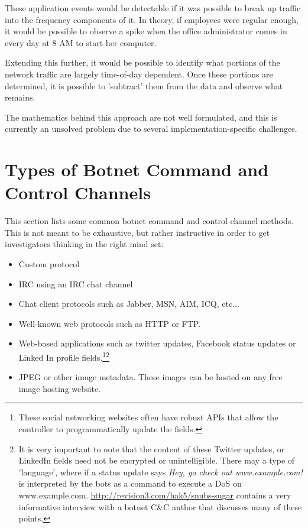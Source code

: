 \documentclass{article}
\theoremstyle{remark}
\theoremstyle{definition}
\theoremstyle{definition}
\theoremstyle{definition}
\begin{document}
These application events would be detectable if it was possible to break up traffic into the frequency components of it. In theory, if employees were regular enough, it would be possible to observe a spike when the office administrator comes in every day at 8 AM to start her computer.

Extending this further, it would be possible to identify what portions of the network traffic are largely time-of-day dependent. Once these portions are determined, it is possible to 'subtract' them from the data and observe what remains.

The mathematics behind this approach are not well formulated, and this is currently an unsolved problem due to several implementation-specific challenges.

\section{Types of Botnet Command and Control Channels}
This section lists some common botnet command and control channel methods. This is not meant to be exhaustive, but rather instructive in order to get investigators thinking in the right mind set:

\begin{itemize}
\item Custom protocol
\item IRC using an IRC chat channel
\item Chat client protocols such as Jabber, MSN, AIM, ICQ, etc...
\item Well-known web protocols such as HTTP or FTP.
\item Web-based applications such as twitter updates, Facebook status updates or Linked In profile fields.\footnote{These social networking websites often have robust APIs that allow the controller to programmatically update the fields.}\footnote{It is very important to note that the content of these Twitter updates, or LinkedIn fields need not be encrypted or unintelligible. There may a type of 'language', where if a status update says \emph{Hey, go check out www.example.com!} is interpreted by the bots as a command to execute a DoS on www.example.com. \url{http://revision3.com/hak5/snubs-sugar} contains a very informative interview with a botnet C\&C author that discusses many of these points.}
\item JPEG or other image metadata. These images can be hosted on any free image hosting website.
\end{itemize}
\end{document}
